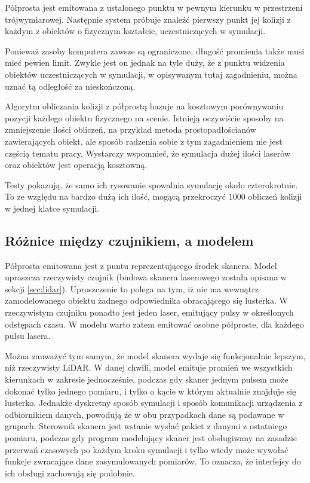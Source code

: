 		Półprosta jest emitowana z ustalonego punktu w pewnym kierunku w przestrzeni trójwymiarowej.
		Następnie system próbuje znaleźć pierwszy punkt jej kolizji z każdym z obiektów o fizycznym kształcie, uczestniczących w symulacji.
		
		Ponieważ zasoby komputera zawsze są ograniczone, długość promienia także musi mieć pewien limit. 
		Zwykle jest on jednak na tyle duży, że z punktu widzenia obiektów uczestniczących w symulacji, w opisywanym tutaj zagadnieniu, 
		można uznać tą odległość za nieskończoną.

		Algorytm obliczania kolizji z półprostą bazuje na kosztowym porównywaniu pozycji każdego obiektu fizycznego na scenie.
		Istnieją oczywiście sposoby na zmniejszenie ilości obliczeń, na przykład metoda prostopadłościanów zawierających obiekt, ale sposób radzenia sobie z tym zagadnieniem nie jest
		częścią tematu pracy,
		Wystarczy wspomnieć, że symulacja dużej ilości laserów oraz obiektów jest operacją kosztowną.
		
		Testy pokazują, że samo ich rysowanie spowalnia symulację około czterokrotnie.
		To ze względu na bardzo dużą ich ilość, mogącą przekroczyć 1000 obliczeń kolizji w jednej klatce symulacji.

	\subsection{Różnice między czujnikiem, a modelem}
		Półprosta emitowana jest z puntu reprezentującego środek skanera.
		Model upraszcza rzeczywisty czujnik (budowa skanera laserowego została opisana w sekcji \ref{sec:lidar}).
		Uproszczenie to polega na tym, iż nie ma wewnątrz zamodelowanego obiektu żadnego odpowiednika obracającego się lusterka.
		W rzeczywistym czujniku ponadto jest jeden laser, emitujący pulsy w określonych odstępach czasu.
		W modelu warto zatem emitować osobne półproste, dla każdego pulsu lasera.

		Można zauważyć tym samym, że model skanera wydaje się funkcjonalnie lepszym, niż rzeczywisty LiDAR.
		W danej chwili, model emituje promień we wszystkich kierunkach w zakresie jednocześnie, podczas gdy skaner jednym pulsem może dokonać tylko jednego pomiaru,
		i tylko o kącie w którym aktualnie znajduje się lusterko.
		Jednakże dyskretny sposób symulacji i sposób komunikacji urządzenia z odbiornikiem danych, powodują że w obu przypadkach dane są podawane w grupach.
		Sterownik skanera jest wstanie wysłać pakiet z danymi z ostatniego pomiaru, podczas gdy program modelujący skaner jest obsługiwany na zasadzie przerwań czasowych 
		po każdym kroku symulacji i tylko wtedy może wywołać funkcje zwracające dane zasymulowanych pomiarów.
		To oznacza, że interfejsy do ich obsługi zachowują się podobnie.

